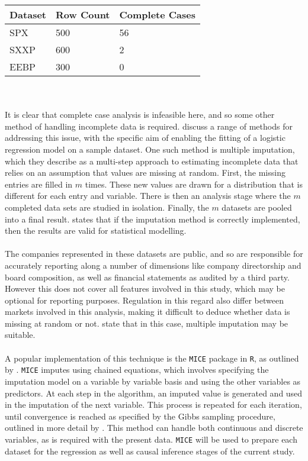 {\begin{tabular}{ |p{3cm}||p{3cm}|p{3cm}|  }
 Dataset & Row Count & Complete Cases\\
 \hline
 SPX & 500 & 56  \\
 SXXP &   600  &  2 \\
 EEBP & 300 & 0  \\
 \hline
\end{tabular}\\\\
It is clear that complete case analysis is infeasible here, and so some other method of handling incomplete data is required. \cite{hortonMissing} discuss a range of methods for addressing this issue, with the specific aim of enabling the fitting of a logistic regression model on a sample dataset. One such method is multiple imputation, which they describe as a multi-step approach to estimating incomplete data that relies on an assumption that values are missing at random. First, the missing entries are filled in $m$ times. These new values are drawn for a distribution that is different for each entry and variable. There is then an analysis stage where the $m$ completed data sets are studied in isolation. Finally, the $m$ datasets are pooled into a final result. \cite{rubin2004multiple} states that if the imputation method is correctly implemented, then the results are valid for statistical modelling.   \\\\
The companies represented in these datasets are public, and so are responsible for accurately reporting along a number of dimensions like company directorship and board composition, as well as financial statements as audited by a third party. However this does not cover all features involved in this study, which may be optional for reporting purposes. Regulation in this regard also differ between markets involved in this analysis, making it difficult to deduce whether data is missing at random or not. \cite{jakobsen2017and} state that in this case, multiple imputation may be suitable. \\\\
A popular implementation of this technique is the \texttt{MICE} package in \texttt{R}, as outlined by \cite{mice}. \texttt{MICE} imputes using chained equations, which involves specifying the imputation model on a variable by variable basis and using the other variables as predictors. At each step in the algorithm, an imputed value is generated and used in the imputation of the next variable. This process is repeated for each iteration, until convergence is reached as specified by the Gibbs sampling procedure, outlined in more detail by \cite{yildirimGibbs}. This method can handle both continuous and discrete variables, as is required with the present data. \texttt{MICE} will be used to prepare each dataset for the regression as well as causal inference stages of the current study. 
}

